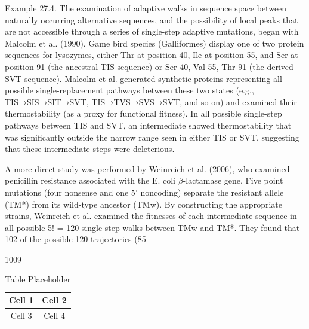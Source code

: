 \documentclass{article}
\begin{document}
Example 27.4. The examination of adaptive walks in sequence space between naturally occurring alternative sequences, and the possibility of local peaks that are not accessible through a series of single-step adaptive mutations, began with Malcolm et al. (1990). Game bird species (Galliformes) display one of two protein sequences for lysozymes, either Thr at position 40, Ile at position 55, and Ser at position 91 (the ancestral TIS sequence) or Ser 40, Val 55, Thr 91 (the derived SVT sequence). Malcolm et al. generated synthetic proteins representing all possible single-replacement pathways between these two states (e.g., TIS→SIS→SIT→SVT, TIS→TVS→SVS→SVT, and so on) and examined their thermostability (as a proxy for functional fitness). In all possible single-step pathways between TIS and SVT, an intermediate showed thermostability that was significantly outside the narrow range seen in either TIS or SVT, suggesting that these intermediate steps were deleterious.

A more direct study was performed by Weinreich et al. (2006), who examined penicillin resistance associated with the E. coli  $ \beta $-lactamase gene. Five point mutations (four nonsense and one 5' noncoding) separate the resistant allele (TM*) from its wild-type ancestor (TMw). By constructing the appropriate strains, Weinreich et al. examined the fitnesses of each intermediate sequence in all possible 5! = 120 single-step walks between TMw and TM*. They found that 102 of the possible 120 trajectories (85%

1009

\begin{table}[h]
\centering
\begin{tabular}{|c|c|}
\hline
Cell 1 & Cell 2 \\
\hline
Cell 3 & Cell 4 \\
\hline
\end{tabular}
\caption{Table Placeholder}
\end{table}
\end{document}
